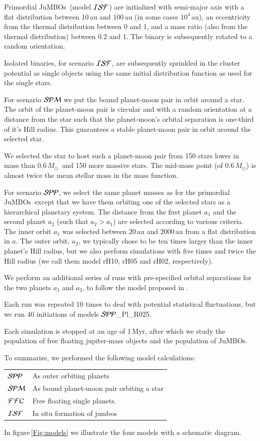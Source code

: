 \documentclass[aa]{lib/aa}
\newcommand{\MSun}{\mbox{${M}_\odot$}}
\newcommand{\jumbos}{\mbox{JuMBOs}}
\begin{document}
Primordial \jumbos\, (model ${\cal ISF}$) are initialized with
semi-major axis with a flat distribution between 10\,au and $100$\,au
(in some cases $10^4$\,au), an eccentricity from the thermal
distribution between 0 and 1, and a mass ratio (also from the thermal
distribution) between 0.2 and 1.  The binary is subsequently rotated
to a random orientation. 

Isolated binaries, for scenario ${\cal ISF}$, are subsequently
sprinkled in the cluster potential as single objects using the same
initial distribution function as used for the single stars.

For scenario ${\cal SPM}$ we put the bound planet-moon pair in orbit
around a star.  The orbit of the planet-moon pair is circular and with
a random orientation at a distance from the star such that the
planet-moon's orbital separation is one-third of it's Hill radius.
This guarantees a stable planet-moon pair in orbit around the selected
star.

We selected the star to host such a planet-moon pair from 150 stars
lower in mass than 0.6\,\MSun\, and 150 more massive stars. The
mid-mass point (of 0.6\,\MSun) is almost twice the mean stellar mass
in the mass function.

For scenario ${\cal SPP}$, we select the same planet masses as for the
primordial \jumbos\, except that we have them orbiting one of the
selected stars as a hierarchical planetary system. The distance from
the first planet $a_1$ and the second planet $a_2$ (such that
$a_2>a_1$) are selected according to various criteria.  The inner
orbit $a_1$ was selected between 20\,au and $2000$\,au from a flat
distribution in $a$.  The outer orbit, $a_2$, we typically chose to be
ten times larger than the inner planet's Hill radius, but we also
perform simulations with five times and twice the Hill radius (we call
them model rH10, rH05 and rH02, respectively).

We perform an additional series of runs with pre-specified orbital
separations for the two planets $a_1$ and $a_2$, to follow the model
proposed in \citep{2023arXiv231006016W}.

Each run was repeated 10 times to deal with potential statistical
fluctuations, but we run 40 initiations of models ${\cal SPP}$\_Pl\_R025.

Each simulation is stopped at an age of 1\,Myr, after which we study
the population of free floating jupiter-mass objects and the
population of \jumbos.

To summarize, we performed the following model calculations:\\
\begin{tabular}{ll}
${\cal SPP}$ & As outer orbiting planets\\
${\cal SPM}$ & As bound planet-moon pair orbiting a star\\
${\cal FFC}$ & Free floating single planets.\\
${\cal ISF}$ & In situ formation of jumbos\\
\end{tabular}
In figure\,\ref{Fig:models} we illustrate the four models with a
schematic diagram.
\end{document}
